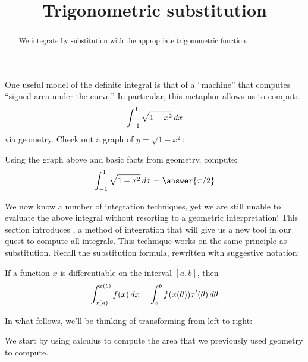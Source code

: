 \documentclass{ximera}
\title[Dig-In:]{Trigonometric substitution}
\begin{document}
\begin{abstract}
  We integrate by substitution with the appropriate trigonometric
  function.
\end{abstract}
\maketitle

One useful model of the definite integral is that of a ``machine''
that computes ``signed area under the curve.'' In particular, this
metaphor allows us to compute
\[
\int_{-1}^1 \sqrt{1-x^2} \mathop{}\!d x
\]
via geometry. Check out a graph of $y= \sqrt{1-x^2}$:
\begin{image}
\end{image}

\begin{question}
  Using the graph above and basic facts from geometry, compute:
  \[
  \int_{-1}^1 \sqrt{1-x^2} \d x = \answer{\pi/2}
  \]
\end{question}

We now know a number of integration techniques, yet we are still
unable to evaluate the above integral without resorting to a geometric
interpretation!  This section introduces ,
a method of integration that will give us a new tool in our quest to compute all integrals.
This technique works on the same principle as substitution. Recall the
substitution formula, rewritten with suggestive notation:

\begin{theorem}  
If a function $x$ is differentiable on the interval $[a,b]$, then
\[
\int_{x(a)}^{x(b)} f(x) \mathop{}\!d x = \int_a^b f(x(\theta)) x'(\theta) \mathop{}\!d \theta 
\]
\end{theorem}
In what follows, we'll be thinking of transforming from left-to-right:
\begin{image}
\end{image}
We start by using calculus to compute the area that we previously used
geometry to compute.
\end{document}
